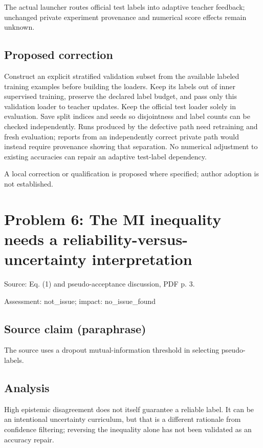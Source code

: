 \documentclass[11pt]{article}
\begin{document}
The actual launcher routes official test labels into adaptive teacher feedback; unchanged private experiment provenance and numerical score effects remain unknown.

\subsection*{Proposed correction}

Construct an explicit stratified validation subset from the available labeled training examples before building the loaders. Keep its labels out of inner supervised training, preserve the declared label budget, and pass only this validation loader to teacher updates. Keep the official test loader solely in evaluation. Save split indices and seeds so disjointness and label counts can be checked independently. Runs produced by the defective path need retraining and fresh evaluation; reports from an independently correct private path would instead require provenance showing that separation. No numerical adjustment to existing accuracies can repair an adaptive test-label dependency.

A local correction or qualification is proposed where specified; author adoption is not established.

\section*{Problem 6: The MI inequality needs a reliability-versus-uncertainty interpretation}

Source: Eq. (1) and pseudo-acceptance discussion, PDF p. 3.

Assessment: not\_issue; impact: no\_issue\_found

\subsection*{Source claim (paraphrase)}

The source uses a dropout mutual-information threshold in selecting pseudo-labels.

\subsection*{Analysis}

High epistemic disagreement does not itself guarantee a reliable label. It can be an intentional uncertainty curriculum, but that is a different rationale from confidence filtering; reversing the inequality alone has not been validated as an accuracy repair.
\end{document}
